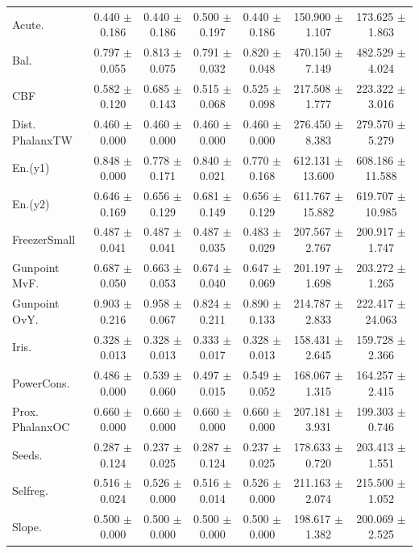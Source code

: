 \begin{table}[t]
{\begin{tabular}{lcccccc}
Acute. & 0.440 $\pm$ 0.186 & 0.440 $\pm$ 0.186 & 0.500 $\pm$ 0.197 & 0.440 $\pm$ 0.186 & 150.900 $\pm$ 1.107 & 173.625 $\pm$ 1.863 \\
Bal. & 0.797 $\pm$ 0.055 & 0.813 $\pm$ 0.075 & 0.791 $\pm$ 0.032 & 0.820 $\pm$ 0.048 & 470.150 $\pm$ 7.149 & 482.529 $\pm$ 4.024 \\
CBF & 0.582 $\pm$ 0.120 & 0.685 $\pm$ 0.143 & 0.515 $\pm$ 0.068 & 0.525 $\pm$ 0.098 & 217.508 $\pm$ 1.777 & 223.322 $\pm$ 3.016 \\
Dist. PhalanxTW & 0.460 $\pm$ 0.000 & 0.460 $\pm$ 0.000 & 0.460 $\pm$ 0.000 & 0.460 $\pm$ 0.000 & 276.450 $\pm$ 8.383 & 279.570 $\pm$ 5.279 \\
En.(y1) & 0.848 $\pm$ 0.000 & 0.778 $\pm$ 0.171 & 0.840 $\pm$ 0.021 & 0.770 $\pm$ 0.168 & 612.131 $\pm$ 13.600 & 608.186 $\pm$ 11.588 \\
En.(y2) & 0.646 $\pm$ 0.169 & 0.656 $\pm$ 0.129 & 0.681 $\pm$ 0.149 & 0.656 $\pm$ 0.129 & 611.767 $\pm$ 15.882 & 619.707 $\pm$ 10.985 \\
FreezerSmall & 0.487 $\pm$ 0.041 & 0.487 $\pm$ 0.041 & 0.487 $\pm$ 0.035 & 0.483 $\pm$ 0.029 & 207.567 $\pm$ 2.767 & 200.917 $\pm$ 1.747 \\
Gunpoint MvF. & 0.687 $\pm$ 0.050 & 0.663 $\pm$ 0.053 & 0.674 $\pm$ 0.040 & 0.647 $\pm$ 0.069 & 201.197 $\pm$ 1.698 & 203.272 $\pm$ 1.265 \\
Gunpoint OvY. & 0.903 $\pm$ 0.216 & 0.958 $\pm$ 0.067 & 0.824 $\pm$ 0.211 & 0.890 $\pm$ 0.133 & 214.787 $\pm$ 2.833 & 222.417 $\pm$ 24.063 \\
Iris. & 0.328 $\pm$ 0.013 & 0.328 $\pm$ 0.013 & 0.333 $\pm$ 0.017 & 0.328 $\pm$ 0.013 & 158.431 $\pm$ 2.645 & 159.728 $\pm$ 2.366 \\
PowerCons. & 0.486 $\pm$ 0.000 & 0.539 $\pm$ 0.060 & 0.497 $\pm$ 0.015 & 0.549 $\pm$ 0.052 & 168.067 $\pm$ 1.315 & 164.257 $\pm$ 2.415 \\
Prox. PhalanxOC & 0.660 $\pm$ 0.000 & 0.660 $\pm$ 0.000 & 0.660 $\pm$ 0.000 & 0.660 $\pm$ 0.000 & 207.181 $\pm$ 3.931 & 199.303 $\pm$ 0.746 \\
Seeds. & 0.287 $\pm$ 0.124 & 0.237 $\pm$ 0.025 & 0.287 $\pm$ 0.124 & 0.237 $\pm$ 0.025 & 178.633 $\pm$ 0.720 & 203.413 $\pm$ 1.551 \\
Selfreg. & 0.516 $\pm$ 0.024 & 0.526 $\pm$ 0.000 & 0.516 $\pm$ 0.014 & 0.526 $\pm$ 0.000 & 211.163 $\pm$ 2.074 & 215.500 $\pm$ 1.052 \\
Slope. & 0.500 $\pm$ 0.000 & 0.500 $\pm$ 0.000 & 0.500 $\pm$ 0.000 & 0.500 $\pm$ 0.000 & 198.617 $\pm$ 1.382 & 200.069 $\pm$ 2.525 \\

\end{tabular}}
\end{table}
